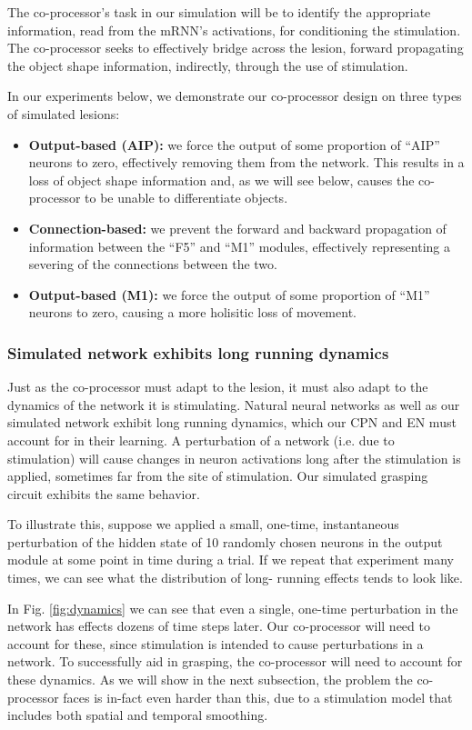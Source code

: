 \documentclass[12pt]{iopart}
\begin{document}
The co-processor's task in our simulation will be to identify the appropriate information,
read from the mRNN's activations, for conditioning the stimulation. The co-processor seeks
to effectively bridge across the lesion, forward propagating the object shape information,
indirectly, through the use of stimulation.

In our experiments below, we demonstrate our co-processor design on three types of
simulated lesions:
\begin{itemize}
	\item \textbf{Output-based (AIP):} we force the output of some proportion of ``AIP''
	      neurons to zero, effectively removing them from the network. This results in a
	      loss of object shape information and, as we will see below, causes the co-processor
	      to be unable to differentiate objects.
	\item \textbf{Connection-based:} we prevent the forward and backward propagation of
	      information between the ``F5'' and ``M1'' modules, effectively representing a
	      severing of the connections between the two.
	\item \textbf{Output-based (M1):} we force the output of some proportion of ``M1''
	      neurons to zero, causing a more holisitic loss of movement.
\end{itemize}

\subsubsection{Simulated network exhibits long running dynamics}
Just as the co-processor must adapt to the lesion, it must also adapt to the dynamics of
the network it is stimulating. Natural neural networks as well as our simulated network
exhibit long running dynamics, which our CPN and EN must account for in their learning.
A perturbation of a network (i.e. due to stimulation) will cause changes in neuron
activations long after the stimulation is applied, sometimes far from the site of
stimulation. Our simulated grasping circuit exhibits the same behavior.

To illustrate this, suppose we applied a small, one-time, instantaneous perturbation
of the hidden state of 10 randomly chosen neurons in the output module at some point
in time during a trial. If we repeat that experiment many times, we can see what the
distribution of long- running effects tends to look like.

In Fig. \ref{fig:dynamics} we can see that even a single, one-time perturbation in
the network has effects dozens of time steps later. Our co-processor will need to
account for these, since stimulation is intended to cause perturbations in a network.
To successfully aid in grasping, the co-processor will need to account for these
dynamics. As we will show in the next subsection, the problem the co-processor faces
is in-fact even harder than this, due to a stimulation model that includes both
spatial and temporal smoothing.
\end{document}
